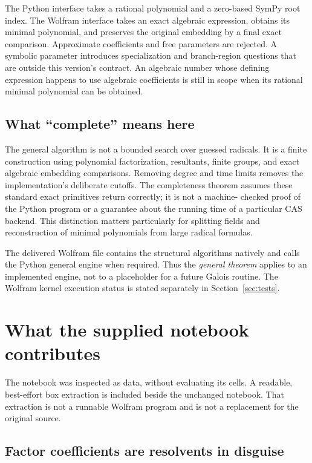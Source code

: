 \documentclass[11pt]{article}
\theoremstyle{definition}\newtheorem{definition}[theorem]{Definition}
\theoremstyle{remark}\newtheorem{remark}[theorem]{Remark}
\begin{document}
The Python interface takes a rational polynomial and a zero-based SymPy root
index. The Wolfram interface takes an exact algebraic expression, obtains its
minimal polynomial, and preserves the original embedding by a final exact
comparison. Approximate coefficients and free parameters are rejected. A
symbolic parameter introduces specialization and branch-region questions that
are outside this version's contract. An algebraic number whose defining
expression happens to use algebraic coefficients is still in scope when its
rational minimal polynomial can be obtained.

\subsection{What ``complete'' means here}

The general algorithm is not a bounded search over guessed radicals. It is a
finite construction using polynomial factorization, resultants, finite groups,
and exact algebraic embedding comparisons. Removing degree and time limits
removes the implementation's deliberate cutoffs. The completeness theorem
assumes these standard exact primitives return correctly; it is not a machine-
checked proof of the Python program or a guarantee about the running time of a
particular CAS backend. This distinction matters particularly for splitting
fields and reconstruction of minimal polynomials from large radical formulas.

The delivered Wolfram file contains the structural algorithms natively and
calls the Python general engine when required. Thus the \emph{general theorem}
applies to an implemented engine, not to a placeholder for a future Galois
routine. The Wolfram kernel execution status is stated separately in
Section~\ref{sec:tests}.

\section{What the supplied notebook contributes}

The notebook was inspected as data, without evaluating its cells. A readable,
best-effort box extraction is included beside the unchanged notebook. That
extraction is not a runnable Wolfram program and is not a replacement for the
original source.

\subsection{Factor coefficients are resolvents in disguise}
\end{document}
